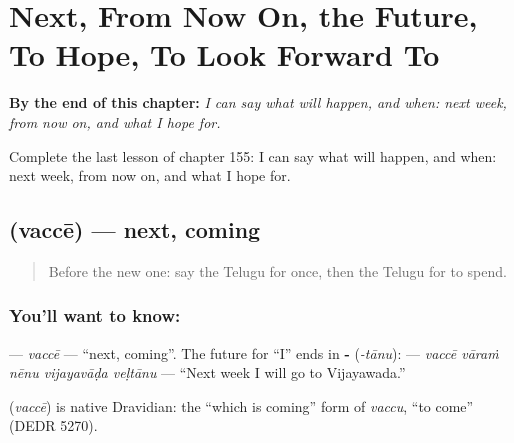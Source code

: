 
\chapter{Next, From Now On, the Future, To Hope, To Look Forward To}
\label{ch:te-next-from-now-on-the-future-to-hope-to-look-forward-to}

\begin{chapteropening}
\textbf{By the end of this chapter:} \emph{I can say what will happen, and when: next week, from now on, and what I hope for.}

Complete the last lesson of chapter 155: I can say what will happen, and when: next week, from now on, and what I hope for.
\end{chapteropening}

\section[\texorpdfstring{\te{వచ్చే} (vaccē)}{వచ్చే (vaccē)}]{ (vaccē) — next, coming}

\label{lesson:TE-C155-vacce}



\begin{quote}
Before the new one: say the Telugu for once, then the Telugu for to spend.
\end{quote}

\subsection*{You'll want to know: }
\textbf{} — \emph{vaccē} — \textquotedblleft{}next, coming\textquotedblright{}. The future for \textquotedblleft{}I\textquotedblright{} ends in \textbf{-} (\emph{-tānu}): \textbf{    } — \emph{vaccē vāraṁ nēnu vijayavāḍa veḷtānu} — \textquotedblleft{}Next week I will go to Vijayawada.\textquotedblright{}

\begin{cousinweb}
\textbf{} (\emph{vaccē}) is native Dravidian: the \textquotedblleft{}which is coming\textquotedblright{} form of \emph{vaccu}, \textquotedblleft{}to come\textquotedblright{} (DEDR 5270).
\end{cousinweb}

